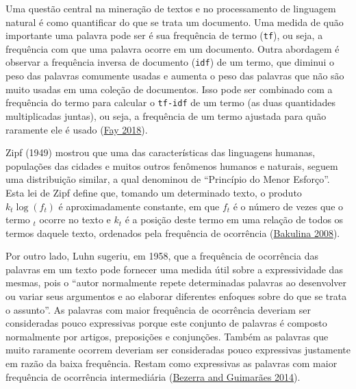 \documentclass[preprint, 3p,
authoryear]{elsarticle} %
\begin{document}
Uma questão central na mineração de textos e no processamento de
linguagem natural é como quantificar do que se trata um documento. Uma
medida de quão importante uma palavra pode ser é sua frequência de termo
(\texttt{tf}), ou seja, a frequência com que uma palavra ocorre em um
documento. Outra abordagem é observar a frequência inversa de documento
(\texttt{idf}) de um termo, que diminui o peso das palavras comumente
usadas e aumenta o peso das palavras que não são muito usadas em uma
coleção de documentos. Isso pode ser combinado com a frequência do termo
para calcular o \texttt{tf-idf} de um termo (as duas quantidades
multiplicadas juntas), ou seja, a frequência de um termo ajustada para
quão raramente ele é usado (\protect\hyperlink{ref-Fay2018}{Fay 2018}).

Zipf (1949) mostrou que uma das características das linguagens humanas,
populações das cidades e muitos outros fenômenos humanos e naturais,
seguem uma distribuição similar, a qual denominou de ``Princípio do
Menor Esforço''. Esta lei de Zipf define que, tomando um determinado
texto, o produto \(k_{t}\log(f_{t})\) é aproximadamente constante, em
que \(f_{t}\) é o número de vezes que o termo \(_t\) ocorre no texto e
\(k_{t}\) é a posição deste termo em uma relação de todos os termos
daquele texto, ordenados pela frequência de ocorrência
(\protect\hyperlink{ref-Bakulina2008}{Bakulina 2008}).

Por outro lado, Luhn sugeriu, em 1958, que a frequência de ocorrência
das palavras em um texto pode fornecer uma medida útil sobre a
expressividade das mesmas, pois o ``autor normalmente repete
determinadas palavras ao desenvolver ou variar seus argumentos e ao
elaborar diferentes enfoques sobre do que se trata o assunto''. As
palavras com maior frequência de ocorrência deveriam ser consideradas
pouco expressivas porque este conjunto de palavras é composto
normalmente por artigos, preposições e conjunções. Também as palavras
que muito raramente ocorrem deveriam ser consideradas pouco expressivas
justamente em razão da baixa frequência. Restam como expressivas as
palavras com maior frequência de ocorrência intermediária
(\protect\hyperlink{ref-Bezerra2014}{Bezerra and Guimarães 2014}).
\end{document}
